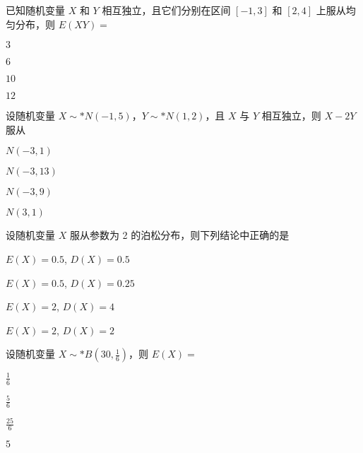 \documentclass{exam-zh}
\begin{document}
\begin{question}
  已知随机变量 $X$ 和 $Y$ 相互独立，且它们分别在区间 $[-1, 3]$ 和 $[2, 4]$ 上服从均匀分布，则 $E(XY) =$ \paren[A]
  \begin{choices}
    \item $3$
    \item $6$
    \item $10$
    \item $12$
  \end{choices}
\end{question}

\begin{question}
  设随机变量 $X \sim* N(-1,5)$，$Y \sim* N(1,2)$，且 $X$ 与 $Y$ 相互独立，则 $X - 2Y$ 服从 \paren[B]
  \begin{choices}
    \item $N(-3,1)$
    \item $N(-3,13)$
    \item $N(-3,9)$
    \item $N(3,1)$
  \end{choices}
\end{question}

\begin{question}
  设随机变量 $X$ 服从参数为 2 的泊松分布，则下列结论中正确的是 \paren[D]
  \begin{choices}
    \item 
    $E(X) = 0.5$, $D(X) = 0.5$
    
    \item 
    $E(X) = 0.5$, $D(X) = 0.25$
    
    \item 
    $E(X) = 2$, $D(X) = 4$
    
    \item 
    $E(X) = 2$, $D(X) = 2$
  \end{choices}
\end{question}

\begin{question}
  设随机变量 $X \sim* B(30, \frac{1}{6})$，则 $E(X) =$ \paren[D]
  \begin{choices}
    \item $\frac{1}{6}$
    \item $\frac{5}{6}$
    \item $\frac{25}{6}$
    \item $5$
  \end{choices}
\end{question}
\end{document}
